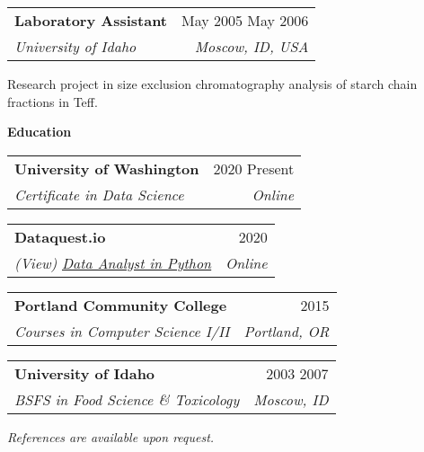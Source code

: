 \documentclass[letterpaper,12pt]{article}[leftmargin=*]
\makeatletter
\def\entryspacing{-0pt}
\newcommand{\education}[2]{\vspace{6pt}
  \colorbox{Copper}{\color{white}\raggedbottom\normalsize\textbf{{#1}{\hspace{9pt}#2\hspace{4pt}}}}
}
\newcommand{\resumeEntryStart}{\begin{itemize}[leftmargin=2.5mm]}
\newcommand{\resumeEntryEnd}{\end{itemize}\vspace{\entryspacing}}
\newcommand{\resumeItemListStart}{\begin{itemize}[leftmargin=4.5mm]}
\newcommand{\resumeItemListEnd}{\end{itemize}}
\newcommand{\resumeItem}[1]{
  \item\small{
    {#1 \vspace{-2pt}}
  }
}
\newcommand{\resumeEntryTSDL}[4]{
  \vspace{-1pt}\item[]
    \begin{tabularx}{0.97\textwidth}{X@{\hspace{60pt}}r}
      \textbf{\color{primary}#1} & {\firabook\color{accent}\small#2} \\
      \textit{\color{accent}\small#3} & \textit{\color{accent}\small#4} \\
    \end{tabularx}\vspace{-6pt}
}
\makeatother
\begin{document}
\resumeEntryStart{
  \resumeEntryTSDL{Laboratory Assistant}{May 2005 \textemdash{} May 2006}{University of Idaho}{Moscow, ID, USA}
  \resumeItemListStart{
    \resumeItem{Research project in size exclusion chromatography analysis of starch chain fractions in Teff.}}
  \resumeItemListEnd{}}
\resumeEntryEnd{}

\education{\faGraduationCap}{Education}

\resumeEntryStart{
  \resumeEntryTSDL{University of Washington}{2020 \textemdash{} Present}{Certificate in Data Science}{Online}
  \resumeEntryTSDL{Dataquest.io}{2020}{(View) \href{https://app.dataquest.io/view_cert/G76HQZAT7X8UQNXKR3LR/}{\underline{Data Analyst in Python}}}{Online}
  \resumeEntryTSDL{Portland Community College}{2015}{Courses in Computer Science I/II}{Portland, OR}
  \resumeEntryTSDL{University of Idaho}{2003 \textemdash{} 2007}{BSFS in Food Science \& Toxicology}{Moscow, ID}}
\resumeEntryEnd{}

\bigskip
\begin{center}
  \color{accent}\small{\textit{References are available upon request.}}
\end{center}
\end{document}
